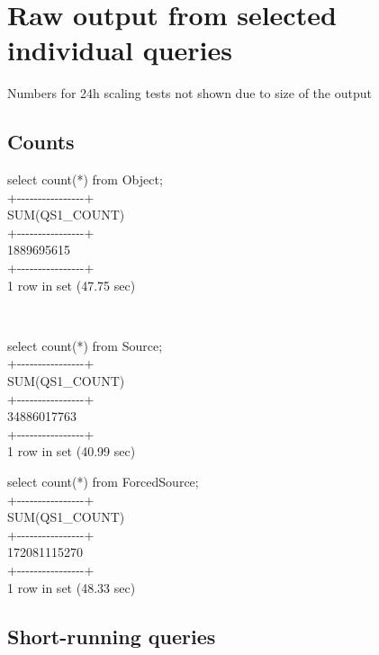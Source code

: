 \documentclass[DM,toc]{lsstdoc}
\begin{document}
\section{Raw output from selected individual
queries}\label{raw-output-from-selected-individual-queries}

Numbers for 24h scaling tests not shown due to size of the output

\subsection{Counts}\label{counts}

select count(*) from Object;\\
+-\/-\/-\/-\/-\/-\/-\/-\/-\/-\/-\/-\/-\/-\/-\/-+\\
\textbar{} SUM(QS1\_COUNT) \textbar{}\\
+-\/-\/-\/-\/-\/-\/-\/-\/-\/-\/-\/-\/-\/-\/-\/-+\\
\textbar{} 1889695615 \textbar{}\\
+-\/-\/-\/-\/-\/-\/-\/-\/-\/-\/-\/-\/-\/-\/-\/-+\\
1 row in set (47.75 sec)

~

select count(*) from Source;\\
+-\/-\/-\/-\/-\/-\/-\/-\/-\/-\/-\/-\/-\/-\/-\/-+\\
\textbar{} SUM(QS1\_COUNT) \textbar{}\\
+-\/-\/-\/-\/-\/-\/-\/-\/-\/-\/-\/-\/-\/-\/-\/-+\\
\textbar{} 34886017763 \textbar{}\\
+-\/-\/-\/-\/-\/-\/-\/-\/-\/-\/-\/-\/-\/-\/-\/-+\\
1 row in set (40.99 sec)

select count(*) from ForcedSource;\\
+-\/-\/-\/-\/-\/-\/-\/-\/-\/-\/-\/-\/-\/-\/-\/-+\\
\textbar{} SUM(QS1\_COUNT) \textbar{}\\
+-\/-\/-\/-\/-\/-\/-\/-\/-\/-\/-\/-\/-\/-\/-\/-+\\
\textbar{} 172081115270 \textbar{}\\
+-\/-\/-\/-\/-\/-\/-\/-\/-\/-\/-\/-\/-\/-\/-\/-+\\
1 row in set (48.33 sec)

\subsection{Short-running queries}\label{short-running-queries}
\end{document}
